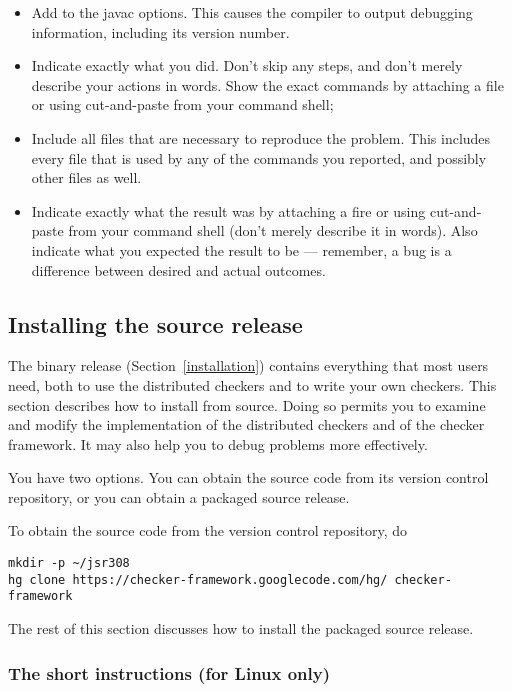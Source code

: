 \begin{itemize}
\item
  Add  to the javac options.  This causes the compiler to output
  debugging information, including its version number.
\item
  Indicate exactly what you did.  Don't skip any steps, and don't merely
  describe your actions in words.  Show the exact commands by attaching a
  file or using cut-and-paste from your command shell;
\item
  Include all files that are necessary to reproduce the problem.  This
  includes every file that is used by any of the commands you reported, and
  possibly other files as well.
\item
  Indicate exactly what the result was by attaching a fire or using
  cut-and-paste from your command shell (don't merely describe it in
  words).  Also indicate what you expected the result to be --- remember, a
  bug is a difference between desired and actual outcomes.
\end{itemize}


\subsection{Installing the source release\label{install-source}}

The binary release (Section~\ref{installation}) contains everything that
most users need, both to use the distributed checkers and to write your own
checkers.  This section describes how to install from source.  Doing
so permits you to examine and modify the implementation of the distributed
checkers and of the checker framework.  It may also help you to debug
problems more effectively.

You have two options.  You can obtain the source code from its version
control repository, or you can obtain a packaged source release.

To obtain the source code from the version control repository, do

\begin{Verbatim}
mkdir -p ~/jsr308
hg clone https://checker-framework.googlecode.com/hg/ checker-framework
\end{Verbatim}


The rest of this section discusses how to install the packaged source release.


\subsubsection{The short instructions (for Linux only)}

